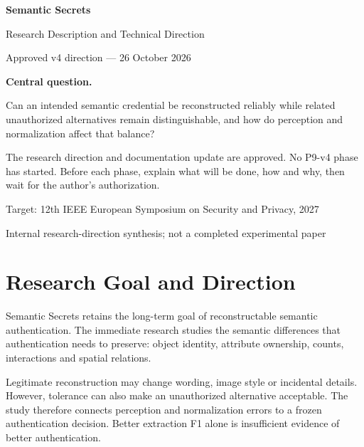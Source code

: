 \documentclass[11pt,a4paper]{article}
\begin{document}
\hypersetup{pageanchor=false}
\begin{titlepage}
\centering
\vspace*{1.5cm}
{\Huge\bfseries\color{SSBlue} Semantic Secrets\par}
\vspace{0.5cm}
{\LARGE Research Description and Technical Direction\par}
\vspace{0.4cm}
{\large Approved v4 direction --- 26 October 2026\par}
\vspace{1cm}
\begin{minipage}{0.88\textwidth}
\begin{keybox}
\textbf{Central question.}\par\medskip
Can an intended semantic credential be reconstructed reliably while related unauthorized alternatives remain distinguishable, and how do perception and normalization affect that balance?
\end{keybox}
\medskip
\begin{statusbox}
The research direction and documentation update are approved. No P9-v4 phase has started. Before each phase, explain what will be done, how and why, then wait for the author's authorization.
\end{statusbox}
\end{minipage}
\vfill
{\large Target: 12th IEEE European Symposium on Security and Privacy, 2027\par}
\medskip
{\small Internal research-direction synthesis; not a completed experimental paper\par}
\end{titlepage}
\hypersetup{pageanchor=true}
\setcounter{tocdepth}{1}
\tableofcontents
\newpage

\section{Research Goal and Direction}
Semantic Secrets retains the long-term goal of reconstructable semantic authentication. The immediate research studies the semantic differences that authentication needs to preserve: object identity, attribute ownership, counts, interactions and spatial relations.

Legitimate reconstruction may change wording, image style or incidental details. However, tolerance can also make an unauthorized alternative acceptable. The study therefore connects perception and normalization errors to a frozen authentication decision. Better extraction F1 alone is insufficient evidence of better authentication.
\end{document}
